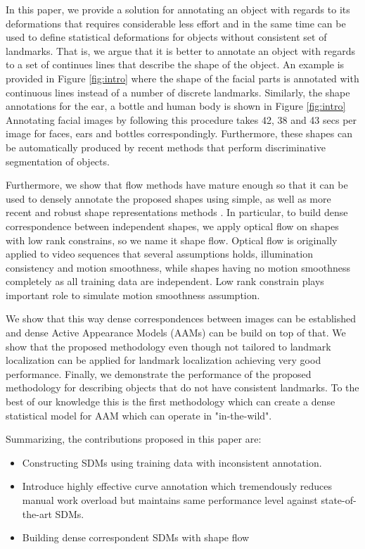 In this paper, we provide a solution for annotating an object with regards to its deformations that requires considerable less effort and in the same time can be used to define statistical deformations for objects without consistent set of landmarks. That is, we argue that it is better to annotate an object with regards to a set of continues lines that describe the shape of the object. An example is provided in Figure \ref{fig:intro} where the shape of the facial parts is annotated with continuous lines instead of a number of discrete landmarks. Similarly, the shape annotations for the ear, a bottle and human body is shown in Figure \ref{fig:intro} Annotating facial images by following this procedure takes 42, 38 and 43 secs per image for faces, ears and bottles correspondingly. Furthermore, these shapes can be automatically produced by recent methods that perform discriminative segmentation of objects. 

Furthermore, we show that flow methods have mature enough so that it can be used to densely annotate the proposed shapes using simple, as well as more recent and robust shape representations methods \cite{Garg:2013hu,Nguyen2013}.  In particular, to build dense correspondence between independent shapes, we apply optical flow on shapes with low rank constrains, so we name it shape flow. Optical flow is originally applied to video sequences that several assumptions holds, illumination consistency and motion smoothness, while shapes having no motion smoothness completely as all training data are independent. Low rank constrain plays important role to simulate motion smoothness assumption. 

We show that this way dense correspondences between images can be established and dense Active Appearance Models (AAMs) can be build on top of that. We show that the proposed methodology even though not tailored to landmark localization can be applied for landmark localization achieving very good performance. Finally, we demonstrate the performance of the proposed methodology for describing objects that do not have consistent landmarks. To the best of our knowledge this is the first methodology which can create a dense statistical model for AAM which can operate in "in-the-wild".



Summarizing, the contributions proposed in this paper are:
\begin{itemize}
  \item Constructing SDMs using training data with inconsistent annotation.
  \item Introduce highly effective curve annotation which tremendously reduces manual work overload but maintains same performance level against state-of-the-art SDMs.
  \item Building dense correspondent SDMs with shape flow
\end{itemize}


